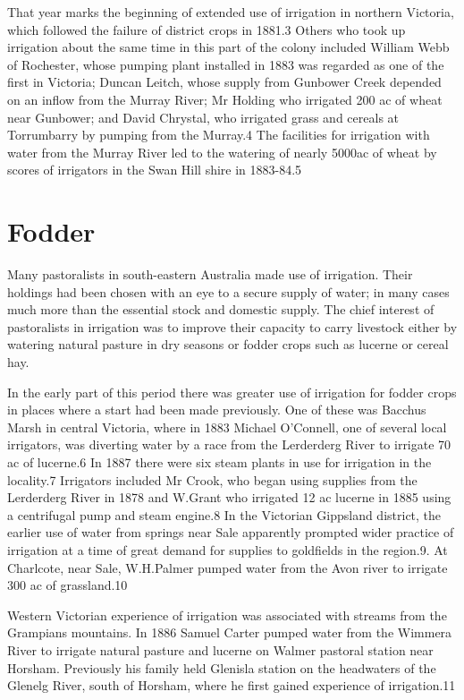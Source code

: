 	That year marks the beginning of extended use of irrigation in northern Victoria, which followed the failure of district crops in 1881.3 Others who took up irrigation about the same time in this part of the colony included William Webb of Rochester, whose pumping plant installed in 1883 was regarded as one of the first in Victoria; Duncan Leitch, whose supply from Gunbower Creek depended on an inflow from the Murray River; Mr Holding who irrigated 200 ac of wheat near Gunbower; and David Chrystal, who irrigated grass and cereals at Torrumbarry by pumping from the Murray.4 The facilities for irrigation with water from the Murray River led to the watering of nearly 5000ac of wheat by scores of irrigators in the Swan Hill shire in 1883-84.5

\section{Fodder}

Many pastoralists in south-eastern Australia made use of
irrigation. Their holdings had been chosen with an eye to a secure
supply of water; in many cases much more than the essential stock and
domestic supply. The chief interest of pastoralists in irrigation was
to improve their capacity to carry livestock either by watering
natural pasture in dry seasons or fodder crops such as lucerne or
cereal hay.

In the early part of this period there was greater use of irrigation
for fodder crops in places where a start had been made previously. One
of these was Bacchus Marsh in central Victoria, where in 1883 Michael
O'Connell, one of several local irrigators, was diverting water by a
race from the Lerderderg River to irrigate 70 ac of lucerne.6 In 1887
there were six steam plants in use for irrigation in the locality.7
Irrigators included Mr Crook, who began using supplies from the
Lerderderg River in 1878 and W.Grant who irrigated 12 ac lucerne in
1885 using a centrifugal pump and steam engine.8 In the Victorian
Gippsland district, the earlier use of water from springs near Sale
apparently prompted wider practice of irrigation at a time of great
demand for supplies to goldfields in the region.9. At Charlcote, near
Sale, W.H.Palmer pumped water from the Avon river to irrigate 300 ac
of grassland.10

Western Victorian experience of irrigation was associated with streams
from the Grampians mountains. In 1886 Samuel Carter pumped water from
the Wimmera River to irrigate natural pasture and lucerne on Walmer
pastoral station near Horsham. Previously his family held Glenisla
station on the headwaters of the Glenelg River, south of Horsham,
where he first gained experience of irrigation.11

